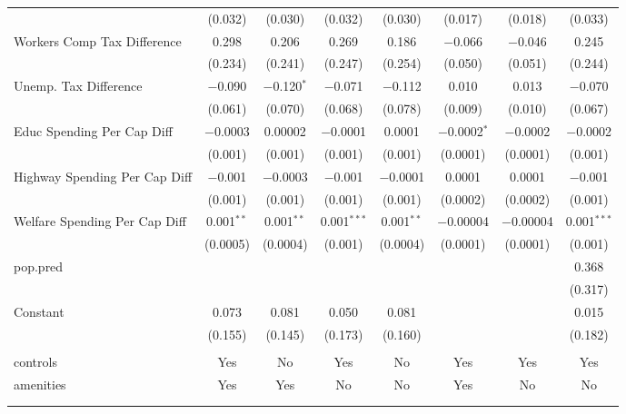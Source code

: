 \begin{table}[!htbp]
\begin{tabular}{@{\extracolsep{5pt}}lccccccc}
  & (0.032) & (0.030) & (0.032) & (0.030) & (0.017) & (0.018) & (0.033) \\ 
  Workers Comp Tax Difference & 0.298 & 0.206 & 0.269 & 0.186 & $-$0.066 & $-$0.046 & 0.245 \\ 
  & (0.234) & (0.241) & (0.247) & (0.254) & (0.050) & (0.051) & (0.244) \\ 
  Unemp. Tax Difference & $-$0.090 & $-$0.120$^{*}$ & $-$0.071 & $-$0.112 & 0.010 & 0.013 & $-$0.070 \\ 
  & (0.061) & (0.070) & (0.068) & (0.078) & (0.009) & (0.010) & (0.067) \\ 
  Educ Spending Per Cap Diff & $-$0.0003 & 0.00002 & $-$0.0001 & 0.0001 & $-$0.0002$^{*}$ & $-$0.0002 & $-$0.0002 \\ 
  & (0.001) & (0.001) & (0.001) & (0.001) & (0.0001) & (0.0001) & (0.001) \\ 
  Highway Spending Per Cap Diff & $-$0.001 & $-$0.0003 & $-$0.001 & $-$0.0001 & 0.0001 & 0.0001 & $-$0.001 \\ 
  & (0.001) & (0.001) & (0.001) & (0.001) & (0.0002) & (0.0002) & (0.001) \\ 
  Welfare Spending Per Cap Diff & 0.001$^{**}$ & 0.001$^{**}$ & 0.001$^{***}$ & 0.001$^{**}$ & $-$0.00004 & $-$0.00004 & 0.001$^{***}$ \\ 
  & (0.0005) & (0.0004) & (0.001) & (0.0004) & (0.0001) & (0.0001) & (0.001) \\ 
  pop.pred &  &  &  &  &  &  & 0.368 \\ 
  &  &  &  &  &  &  & (0.317) \\ 
  Constant & 0.073 & 0.081 & 0.050 & 0.081 &  &  & 0.015 \\ 
  & (0.155) & (0.145) & (0.173) & (0.160) &  &  & (0.182) \\ 
 \hline \\[-1.8ex] 
controls & Yes & No & Yes & No & Yes & Yes & Yes \\ 
amenities & Yes & Yes & No & No & Yes & No & No \\ 
\hline \\[-1.8ex] 
\hline 
\hline \\[-1.8ex] 
\end{tabular} 
\end{table} 
